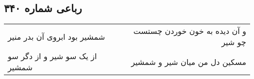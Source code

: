 \begin{center}
\section*{رباعی شماره ۳۴۰}
\label{sec:sh340}
\begin{longtable}{l p{0.5cm} r}
شمشیر بود ابروی آن بدر منیر
&&
و آن دیده به خون خوردن چستست چو شیر
\\
از یک سو شیر و از دگر سو شمشیر
&&
مسکین دل من میان شیر و شمشیر
\\
\end{longtable}
\end{center}
